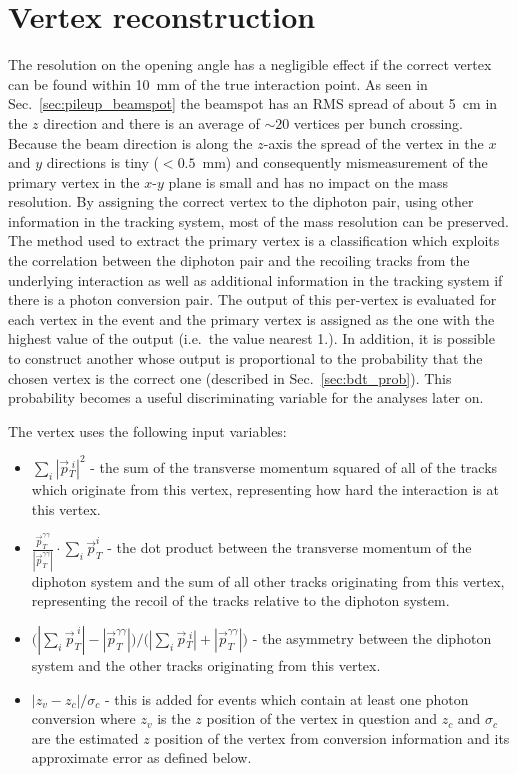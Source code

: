\section{Vertex reconstruction}
\label{sec:vtx_reco}

The resolution on the opening angle has a negligible effect if the correct vertex can be found within 10~mm of the true interaction point. As seen in Sec.~\ref{sec:pileup_beamspot} the beamspot has an RMS spread of about 5~cm in the $z$ direction and there is an average of $\sim20$ vertices per bunch crossing. Because the beam direction is along the $z$-axis the spread of the vertex in the $x$ and $y$ directions is tiny ($<0.5$~mm) and consequently mismeasurement of the primary vertex in the $x$-$y$ plane is small and has no impact on the mass resolution. By assigning the correct vertex to the diphoton pair, using other information in the tracking system, most of the mass resolution can be preserved. The method used to extract the primary vertex is a classification \BDT which exploits the correlation between the diphoton pair and the recoiling tracks from the underlying interaction as well as additional information in the tracking system if there is a photon conversion pair. The output of this per-vertex \BDT is evaluated for each vertex in the event and the primary vertex is assigned as the one with the highest value of the \BDT output (i.e.\ the value nearest 1.). In addition, it is possible to construct another \BDT whose output is proportional to the probability that the chosen vertex is the correct one (described in Sec.~\ref{sec:bdt_prob}). This probability becomes a useful discriminating variable for the analyses later on.

The vertex \BDT uses the following input variables:

\begin{itemize}
  \item $\sum\limits_{i} |\vec{p}{}^{\;i}_{T}|^{2}$ - the sum of the transverse momentum squared of all of the tracks which originate from this vertex, representing how hard the interaction is at this vertex.
  \item $\frac{\vec{p}^{\gamma\gamma}_{T}}{|\vec{p}^{\gamma\gamma}_{T}|} \cdot \sum\limits_{i} \vec{p}_{T}^{i}$ - the dot product between the transverse momentum of the diphoton system and the sum of all other tracks originating from this vertex, representing the recoil of the tracks relative to the diphoton system.
  \item $\bigr(|\sum\limits_{i} \vec{p}^{\;i}_{T}| - |\vec{p}^{\gamma\gamma}_{T}|\bigl) / \bigr(|\sum\limits_{i} \vec{p}{}^{\;i}_{T}| + |\vec{p}^{\gamma\gamma}_{T}|\bigl)$ - the asymmetry between the diphoton system and the other tracks originating from this vertex.
  \item $|z_{v}-z_{c}|/\sigma_{c}$ - this is added for events which contain at least one photon conversion where $z_{v}$ is the $z$ position of the vertex in question and $z_{c}$ and $\sigma_{c}$ are the estimated $z$ position of the vertex from conversion information and its approximate error as defined below.
\end{itemize}

